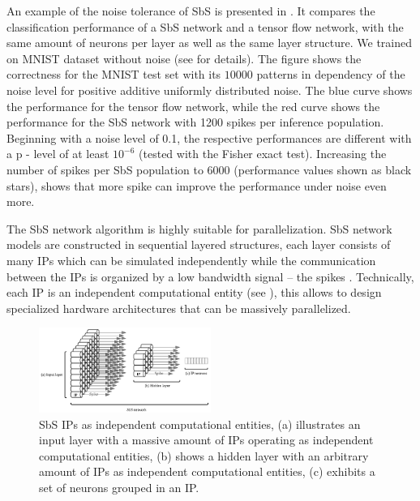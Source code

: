 An example of the noise tolerance of SbS is presented in
. It compares the classification performance of
a SbS network and a tensor flow network, with the same amount of
neurons per layer as well as the same layer structure. We trained on MNIST dataset\cite{lecun1998mnist} without noise (see \cite{rotermund2019Backpropagation} for details). The figure shows the correctness for the MNIST test set with its $10000$ patterns in dependency of the noise level for positive additive
uniformly distributed noise. The blue curve shows the performance for
the tensor flow network, while the red curve shows the performance for
the SbS network with 1200 spikes per inference population. Beginning
with a noise level of 0.1, the respective performances are different
with a p - level of at least $10^{-6}$ (tested with the Fisher exact
test). Increasing the number of spikes per SbS population to 6000
(performance values shown as black stars), shows that more spike can
improve the performance under noise even more.

The SbS network algorithm is highly suitable for parallelization. SbS network models are constructed in sequential layered structures, each layer consists of many IPs which can be simulated independently while the communication between the IPs is organized by a low bandwidth signal -- the spikes \cite{Rotermund500280}. Technically, each IP is an independent computational entity (see ), this allows to design specialized hardware architectures that can be massively parallelized.

\begin{figure}
	\centering
	\includegraphics[width=0.5\textwidth]{../figures/SbS_layer.pdf}
	\caption{SbS IPs as independent computational entities, (a) illustrates an input layer with a massive amount of IPs operating as independent computational entities, (b) shows a hidden layer with an arbitrary amount of IPs as independent computational entities, (c) exhibits a set of neurons grouped in an IP. }
	\label{fig:SbS_layer}
\end{figure}
